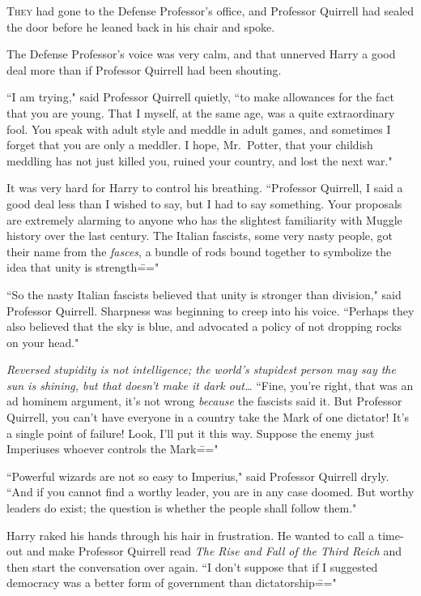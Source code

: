 
\lettrine{T}{hey} had gone to the Defense Professor's office, and Professor Quirrell had sealed the door before he leaned back in his chair and spoke.

The Defense Professor's voice was very calm, and that unnerved Harry a good deal more than if Professor Quirrell had been shouting.

``I am trying," said Professor Quirrell quietly, ``to make allowances for the fact that you are young. That I myself, at the same age, was a quite extraordinary fool. You speak with adult style and meddle in adult games, and sometimes I forget that you are only a meddler. I hope, Mr.~Potter, that your childish meddling has not just killed you, ruined your country, and lost the next war."

It was very hard for Harry to control his breathing. ``Professor Quirrell, I said a good deal less than I wished to say, but I had to say something. Your proposals are extremely alarming to anyone who has the slightest familiarity with Muggle history over the last century. The Italian fascists, some very nasty people, got their name from the \emph{fasces}, a bundle of rods bound together to symbolize the idea that unity is strength\==="

``So the nasty Italian fascists believed that unity is stronger than division," said Professor Quirrell. Sharpness was beginning to creep into his voice. ``Perhaps they also believed that the sky is blue, and advocated a policy of not dropping rocks on your head."

\emph{Reversed stupidity is not intelligence; the world's stupidest person may say the sun is shining, but that doesn't make it dark out{\ldots}} ``Fine, you're right, that was an ad hominem argument, it's not wrong \emph{because} the fascists said it. But Professor Quirrell, you can't have everyone in a country take the Mark of one dictator! It's a single point of failure! Look, I'll put it this way. Suppose the enemy just Imperiuses whoever controls the Mark\==="

``Powerful wizards are not so easy to Imperius," said Professor Quirrell dryly. ``And if you cannot find a worthy leader, you are in any case doomed. But worthy leaders do exist; the question is whether the people shall follow them."

Harry raked his hands through his hair in frustration. He wanted to call a time-out and make Professor Quirrell read \emph{The Rise and Fall of the Third Reich} and then start the conversation over again. ``I don't suppose that if I suggested democracy was a better form of government than dictatorship\==="

